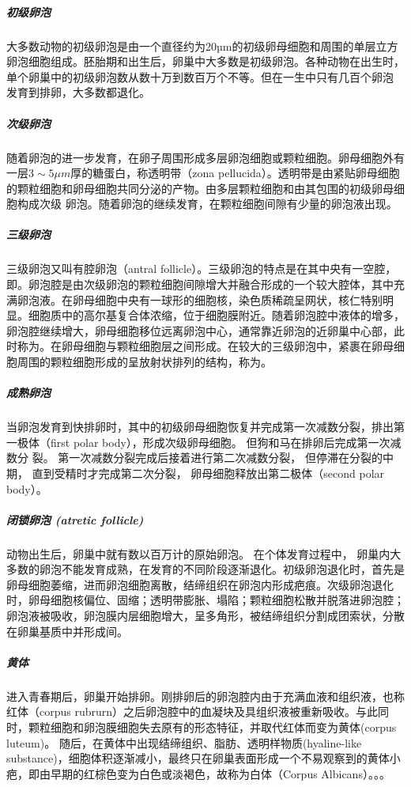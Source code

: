 \subparagraph{初级卵泡}

大多数动物的初级卵泡是由一个直径约为20µm的初级卵母细胞和周围的单层立方卵泡细胞组成。胚胎期和出生后，卵巢中大多数是初级卵泡。各种动物在出生时，单个卵巢中的初级卵泡数从数十万到数百万个不等。但在一生中只有几百个卵泡 发育到排卵，大多数都退化。

\subparagraph{次级卵泡}

随着卵泡的进一步发育，在卵子周围形成多层卵泡细胞或颗粒细胞。卵母细胞外有一层$ 3\sim 5\mu m $厚的糖蛋白，称透明带（zona pellucida）。透明带是由紧贴卵母细胞的颗粒细胞和卵母细胞共同分泌的产物。由多层颗粒细胞和由其包围的初级卵母细胞构成次级 卵泡。随着卵泡的继续发育，在颗粒细胞间隙有少量的卵泡液出现。

\subparagraph{三级卵泡}

三级卵泡又叫有腔卵泡（antral follicle）。三级卵泡的特点是在其中央有一空腔，即。卵泡腔是由次级卵泡的颗粒细胞间隙增大并融合形成的一个较大腔体，其中充满卵泡液。在卵母细胞中央有一球形的细胞核，染色质稀疏呈网状，核仁特别明显。细胞质中的高尔基复合体浓缩，位于细胞膜附近。随着卵泡腔中液体的增多，卵泡腔继续增大，卵母细胞移位远离卵泡中心，通常靠近卵泡的近卵巢中心部，此时称为。在卵母细胞与颗粒细胞层之间形成。在较大的三级卵泡中，紧裹在卵母细胞周围的颗粒细胞形成的呈放射状排列的结构，称为。

\subparagraph{成熟卵泡}

当卵泡发育到快排卵时，其中的初级卵母细胞恢复并完成第一次减数分裂，排出第一极体（first polar body），形成次级卵母细胞。 但狗和马在排卵后完成第一次减数分 裂。 第一次减数分裂完成后接着进行第二次减数分裂， 但停滞在分裂的中期， 直到受精时才完成第二次分裂， 卵母细胞释放出第二极体（second polar body）。

\subparagraph{闭锁卵泡 (atretic follicle)}
动物出生后，卵巢中就有数以百万计的原始卵泡。 在个体发育过程中， 卵巢内大多数的卵泡不能发育成熟，在发育的不同阶段逐渐退化。初级卵泡退化时，首先是卵母细胞萎缩，进而卵泡细胞离散，结缔组织在卵泡内形成疤痕。次级卵泡退化时，卵母细胞核偏位、固缩；透明带膨胀、塌陷；颗粒细胞松散并脱落进卵泡腔；卵泡液被吸收，卵泡膜内层细胞增大，呈多角形，被结缔组织分割成团索状，分散在卵巢基质中并形成间。

\subparagraph{黄体}
进入青春期后，卵巢开始排卵。刚排卵后的卵泡腔内由于充满血液和组织液，也称红体（corpus rubrurn）之后卵泡腔中的血凝块及具组织液被重新吸收。与此同时，颗粒细胞和卵泡膜细胞失去原有的形态特征，并取代红体而变为黄体(corpus luteum)。 随后，在黄体中出现结缔组织、脂肪、透明样物质(hyaline-like substance)，细胞体积逐渐减小，最终只在卵巢表面形成一个不易观察到的黄体小疤，即由早期的红棕色变为白色或淡褐色，故称为白体（Corpus Albicans）。。。

